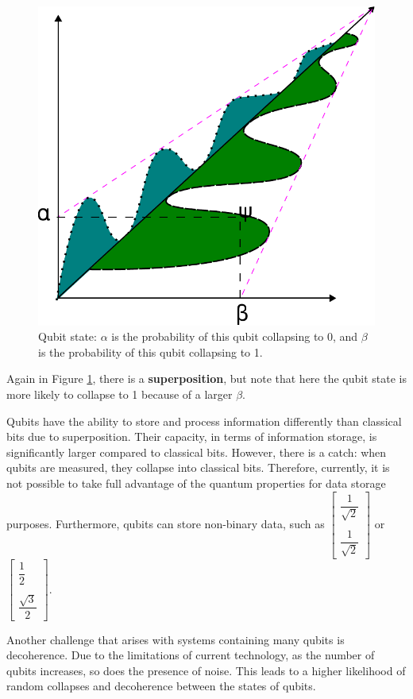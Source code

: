 		\begin{figure}[H]
			\centering
			\includegraphics[width=0.5\linewidth]{images/photonState03}
			\caption[Qubit state 3]{Qubit state: $\alpha$ is the probability of this qubit collapsing to 0, and $\beta$ is the probability of this qubit collapsing to 1.}
			\label{fig:photonstate03}
		\end{figure}
		
		\par Again in Figure \ref{fig:photonstate03}, there is a \textbf{superposition}, but note that here the qubit state is more likely to collapse to 1 because of a larger $\beta$.\newline

		\par Qubits have the ability to store and process information differently than classical bits due to superposition. Their capacity, in terms of information storage, is significantly larger compared to classical bits. However, there is a catch: when qubits are measured, they collapse into classical bits. Therefore, currently, it is not possible to take full advantage of the quantum properties for data storage purposes. Furthermore, qubits can store non-binary data, such as $\begin{bmatrix} \dfrac{1}{\sqrt{2}} \\\\ \dfrac{1}{\sqrt{2}} \end{bmatrix}$ or $\begin{bmatrix} \dfrac{1}{2} \\\\ \dfrac{\sqrt{3}}{2} \end{bmatrix}$.\newline
		
		\par Another challenge that arises with systems containing many qubits is decoherence. Due to the limitations of current technology, as the number of qubits increases, so does the presence of noise. This leads to a higher likelihood of random collapses and decoherence between the states of qubits.\newline
		
